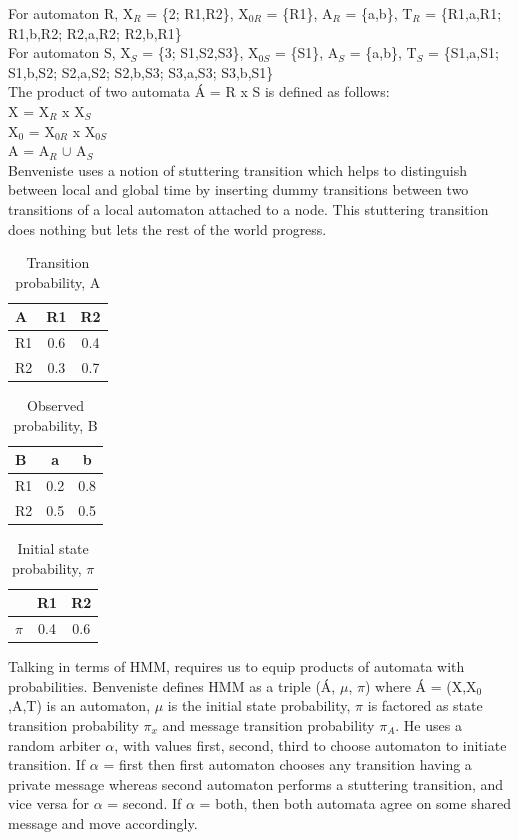 \documentclass[10pt, conference, compsocconf]{IEEEtran}
\begin{document}
For automaton R, X$_{R}$ = \{2; R1,R2\}, X$_{0R}$ = \{R1\}, A$_{R}$ = \{a,b\}, T$_{R}$ = \{R1,a,R1; R1,b,R2; R2,a,R2; R2,b,R1\} \\
For automaton S, X$_{S}$ = \{3; S1,S2,S3\}, X$_{0S}$ = \{S1\}, A$_{S}$ = \{a,b\}, T$_{S}$ = \{S1,a,S1; S1,b,S2; S2,a,S2; S2,b,S3; S3,a,S3; S3,b,S1\} \\
The product of two automata \'{A} = R x S is defined as follows: \\
X = X$_{R}$ x X$_{S}$ \\
X$_{0}$ = X$_{0R}$ x X$_{0S}$ \\
A = A$_{R}$ $\cup$ A$_{S}$ \\
Benveniste uses a notion of stuttering transition which helps to distinguish between local and global time by inserting dummy transitions between two transitions of a local automaton attached to a node. This stuttering transition does nothing but lets the rest of the world progress.

\begin{table}[h]
\centering
\begin{tabular}{ l | c | c }
 A & R1 & R2 \\
\hline
R1 & 0.6 & 0.4 \\
R2 & 0.3 & 0.7 \\
\end{tabular}
\caption{Transition probability, A}
\label{table:A}
\end{table}

\begin{table}[h]
\centering
\begin{tabular}{ l | c | c }
 B & a & b \\
\hline
R1 & 0.2 & 0.8 \\
R2 & 0.5 & 0.5 \\
\end{tabular}
\caption{Observed probability, B}
\label{table:B}
\end{table}

\begin{table}[h]
\centering
\begin{tabular}{ l | c | c }
&  R1 & R2 \\
\hline
$\pi$ & 0.4 & 0.6 \\

\end{tabular}
\caption{Initial state probability, $\pi$}
\label{table:pi}
\end{table}

Talking in terms of HMM, requires us to equip products of automata with probabilities. Benveniste defines HMM as a triple (\'{A}, $\mu$, $\pi$) where \'{A} = (X,X$_{0}$,A,T) is an automaton, $\mu$ is the initial state probability, $\pi$ is factored as state transition probability $\pi$$_{x}$ and message transition probability $\pi$$_{A}$. He uses a random arbiter $\alpha$, with values {first, second, third} to choose automaton to initiate transition. If $\alpha$ = first then first automaton chooses any transition having a private message whereas second automaton performs a stuttering transition, and vice versa for $\alpha$ = second. If $\alpha$ = both, then both automata agree on some shared message and move accordingly.
\end{document}
